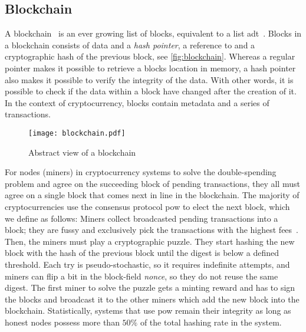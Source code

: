 \subsection{Blockchain}\label{sec:blockchain}
A blockchain~\cite{bitcoin_book} is an ever growing list of blocks, equivalent to a list \ac{adt}~\cite{bitcoin_book}. Blocks in a blockchain consists of data and a \emph{hash pointer}, a reference to and a cryptographic hash of the previous block, see \autoref{fig:blockchain}. Whereas a regular pointer makes it possible to retrieve a blocks location in memory, a hash pointer also makes it possible to verify the integrity of the data. With other words, it is possible to check if the data within a block have changed after the creation of it. In the context of cryptocurrency, blocks contain metadata and a series of transactions.

\begin{figure}[ht]
    \texttt{[image: blockchain.pdf]}
    \caption{Abstract view of a blockchain}
    \label{fig:blockchain}
\end{figure}

For nodes (miners) in cryptocurrency systems to solve the double-spending problem and agree on the succeeding block of pending transactions, they all must agree on a single block that comes next in line in the blockchain. The majority of cryptocurrencies use the consensus protocol \ac{pow} to elect the next block, which we define as follows: Miners collect broadcasted pending transactions into a block; they are fussy and exclusively pick the transactions with the highest fees~\cite{trends_fee, trans_fee}. Then, the miners must play a cryptographic puzzle. They start hashing the new block with the hash of the previous block until the digest is below a defined threshold. Each try is pseudo-stochastic, so it requires indefinite attempts, and miners can flip a bit in the block-field \emph{nonce}, so they do not reuse the same digest. The first miner to solve the puzzle gets a minting reward and has to sign the blocks and broadcast it to the other miners which add the new block into the blockchain. Statistically, systems that use \ac{pow} remain their integrity as long as honest nodes possess more than $50\%$ of the total hashing rate in the system.


